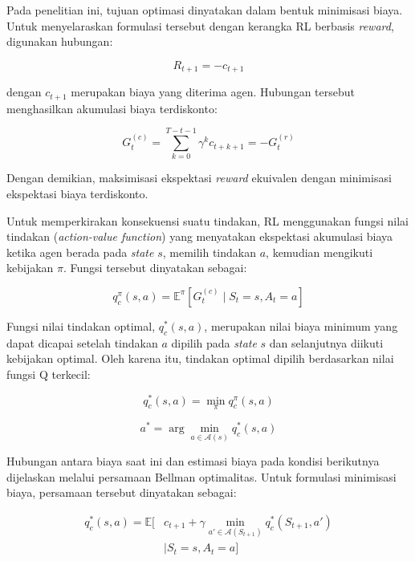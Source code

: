 Pada penelitian ini, tujuan optimasi dinyatakan dalam bentuk minimisasi biaya. Untuk menyelaraskan formulasi tersebut dengan kerangka RL berbasis \textit{reward}, digunakan hubungan:

\begin{equation}
\label{eq:reward_cost_relation}
R_{t+1}=-c_{t+1}
\end{equation}

dengan $c_{t+1}$ merupakan biaya yang diterima agen. Hubungan tersebut menghasilkan akumulasi biaya terdiskonto:

\begin{equation}
\label{eq:cost_return}
G_t^{(c)}
=
\sum_{k=0}^{T-t-1}
\gamma^k c_{t+k+1}
=
-G_t^{(r)}
\end{equation}

Dengan demikian, maksimisasi ekspektasi \textit{reward} ekuivalen dengan minimisasi ekspektasi biaya terdiskonto.

Untuk memperkirakan konsekuensi suatu tindakan, RL menggunakan fungsi nilai tindakan (\textit{action-value function}) yang menyatakan ekspektasi akumulasi biaya ketika agen berada pada \textit{state} $s$, memilih tindakan $a$, kemudian mengikuti kebijakan $\pi$. Fungsi tersebut dinyatakan sebagai:

\begin{equation}
\label{eq:q_policy_cost}
q_c^\pi(s,a)
=
\mathbb{E}^{\pi}
\left[
G_t^{(c)}
\mid S_t=s,A_t=a
\right]
\end{equation}

Fungsi nilai tindakan optimal, $q_c^*(s,a)$, merupakan nilai biaya minimum yang dapat dicapai setelah tindakan $a$ dipilih pada \textit{state} $s$ dan selanjutnya diikuti kebijakan optimal. Oleh karena itu, tindakan optimal dipilih berdasarkan nilai fungsi Q terkecil:

\begin{equation}
\label{eq:q_optimal_cost}
q_c^*(s,a)
=
\min_{\pi}q_c^\pi(s,a)
\end{equation}

\begin{equation}
\label{eq:optimal_action_cost}
a^*
=
\arg\min_{a\in\mathcal{A}(s)}
q_c^*(s,a)
\end{equation}

Hubungan antara biaya saat ini dan estimasi biaya pada kondisi berikutnya dijelaskan melalui persamaan Bellman optimalitas. Untuk formulasi minimisasi biaya, persamaan tersebut dinyatakan sebagai:

\begin{equation}
\label{eq:bellman_cost}
\begin{aligned}
q_c^*(s,a)
=
\mathbb{E}\bigg[
&c_{t+1}
+\gamma
\min_{a'\in\mathcal{A}(S_{t+1})}
q_c^*(S_{t+1},a')\\
&\mid S_t=s,A_t=a
\bigg]
\end{aligned}
\end{equation}

